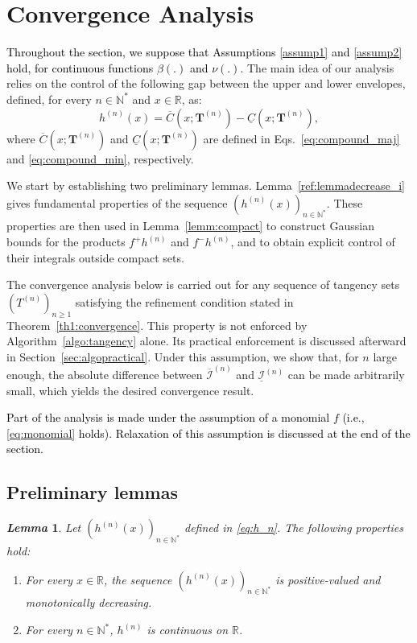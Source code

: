 \documentclass[review]{elsarticle}
\newcommand{\cblue}{\textcolor{black}}
\newtheorem{lemma}{\em Lemma}
\begin{document}
\section{Convergence Analysis}
\label{sec_convergence_analysis}
\cblue{
 Throughout the section, we suppose that Assumptions \ref{assump1} and \ref{assump2} hold, for continuous functions $\beta(.)$ and $\nu(.)$.}
The main idea of our analysis relies on the control of the following gap between the upper and lower envelopes, defined, for every \( n \in \mathbb{N}^* \) and \( x \in \mathbb{R} \), as:
\begin{equation}
\label{eq:h_n}
h^{(n)}(x) = \overline{C}(x; \mathbf{T}^{(n)}) - \underline{C}(x; \mathbf{T}^{(n)}),
\end{equation}
where \( \overline{C}(x; \mathbf{T}^{(n)}) \) and \( \underline{C}(x; \mathbf{T}^{(n)}) \) are defined in Eqs.~\ref{eq:compound_maj} and \ref{eq:compound_min}, respectively.


We start by establishing two preliminary lemmas. Lemma~\ref{ref:lemmadecrease_i} gives fundamental properties of the sequence $(h^{(n)}(x))_{n \in \mathbb{N}^*}$. These properties are then used in Lemma~\ref{lemm:compact} to construct Gaussian bounds for the products $f^+ h^{(n)}$ and $f^- h^{(n)}$, and to obtain explicit control of their integrals outside compact sets.

The convergence analysis below is carried out for any sequence of tangency sets $(T^{(n)})_{n\ge1}$ satisfying the refinement condition stated in Theorem~\ref{th1:convergence}. This property is not enforced by Algorithm~\ref{algo:tangency} alone. Its practical enforcement is discussed afterward in Section~\ref{sec:algopractical}. Under this assumption, we show that, for $n$ large enough, the absolute difference between $\overline{\mathcal{I}}^{(n)}$ and $\underline{\mathcal{I}}^{(n)}$ can be made arbitrarily small, which yields the desired convergence result.

\cblue{Part of the analysis is made under the assumption of a monomial $f$ (i.e., \eqref{eq:monomial} holds). Relaxation of this assumption is discussed at the end of the section.}

\subsection{Preliminary lemmas}

\begin{lemma}
Let $(h^{(n)}(x))_{n \in \mathbb{N}^*}$ defined in \eqref{eq:h_n}. The following properties hold:
\begin{enumerate}
    \item[(i)] For every \( x \in \mathbb{R} \), the sequence \( (h^{(n)}(x))_{n \in \mathbb{N}^*} \) is positive-valued and monotonically decreasing.
    \label{ref:lemmadecrease_i}
    \item[(ii)] For every \( n \in \mathbb{N}^* \), \( h^{(n)} \) is continuous on \( \mathbb{R} \).
    \label{ref:lemmadecrease_ii}
\end{enumerate}
\end{lemma}
\end{document}

